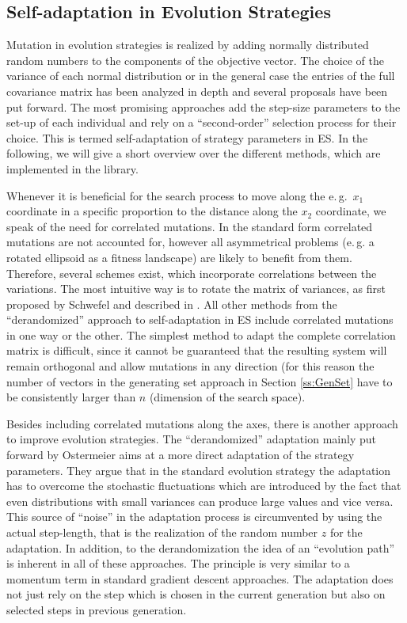 \renewcommand{\vec}[1]{\mathbf{#1}} %

\subsection{Self-adaptation in Evolution Strategies}
Mutation in evolution strategies is realized by adding normally
distributed random numbers to the components of the objective
vector. The choice of the variance of each normal distribution 
or in the general case the entries of the full
covariance matrix has been analyzed in depth and several 
proposals have been put forward. The most promising approaches
add the step-size parameters to the set-up of each individual and rely
on a ``second-order'' selection process for their choice. This is
termed self-adaptation of strategy parameters in ES. In the following, we
will give a short overview over the different methods, which are
implemented in the library.

Whenever it is beneficial for the search process to move along the
e.\,g.\ $x_1$ coordinate in a specific proportion to the distance along the 
$x_2$ coordinate, we speak of the need for correlated mutations. In the
standard form correlated mutations are not accounted for, however all
asymmetrical problems (e.\,g. a rotated ellipsoid as a fitness
landscape) are likely to benefit from them. Therefore,
several schemes exist, which incorporate correlations between the 
variations. The most intuitive way is to rotate the matrix of
variances, as first proposed by Schwefel and described in
\cite{Baeck:96}. All other methods from the ``derandomized'' approach to 
self-adaptation in ES include correlated mutations in one way or the
other. The simplest method to adapt the complete correlation matrix is
difficult, since it cannot be guaranteed that the resulting system
will remain orthogonal and allow mutations in any direction 
(for this reason the number of vectors in the generating set 
approach in Section \ref{ss:GenSet} have to be consistently 
larger than $n$ (dimension of the search space).

Besides including correlated mutations along the axes, there is 
another approach to improve evolution strategies.
The ``derandomized'' adaptation mainly put forward by Ostermeier
\cite{Ostermeier:92,Ostermeier:94} aims at a more direct
adaptation of the strategy parameters. They argue that in the 
standard evolution strategy the adaptation has to overcome
the stochastic fluctuations which are introduced by the fact that even
distributions with small variances can produce large values and vice
versa. This source of ``noise'' in the adaptation process is
circumvented by using the actual step-length, that is the realization
of the random number $z$ for the adaptation. In addition, to the
derandomization the idea of an ``evolution path'' is inherent in all
of these approaches. The principle is very similar to a momentum term
in standard gradient descent approaches. The adaptation does not just 
rely on the step which is chosen in the current generation but also 
on selected steps in previous generation.


